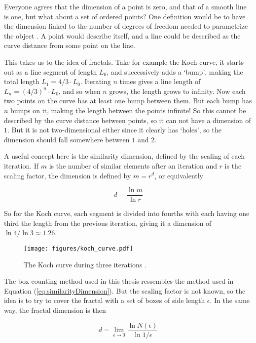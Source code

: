 Everyone agrees that the dimension of a point is zero, and that of a smooth line is one, but what about a set of ordered points? One definition would be to have the dimension linked to the number of degrees of freedom needed to parametrize the object \cite{strogatz:dynamics_chaos}. A point would describe itself, and a line could be described as the curve distance from some point on the line.

This takes us to the idea of fractals. Take for example the Koch curve, it starts out as a line segment of length $L_0$, and successively adds a `bump', making the total length $L_1 = 4/3 \cdot L_0$. Iterating $n$ times gives a line length of $L_n = {(4 / 3)}^n \cdot L_0$, and so when $n$ grows, the length grows to infinity. Now each two points on the curve has at least one bump between them. But each bump has $n$ bumps on it, making the length between the points infinite! So this cannot be described by the curve distance between points, so it can not have a dimension of $1$. But it is not two-dimensional either since it clearly has `holes', so the dimension should fall somewhere between $1$ and $2$.

A useful concept here is the similarity dimension, defined by the scaling of each iteration. If $m$ is the number of similar elements after an iteration and $r$ is the scaling factor, the dimension is defined by $m = r^d$, or equivalently

\begin{equation}
	d = \frac{\ln m}{\ln r}
\label{eq:similarityDimension}
\end{equation}

So for the Koch curve, each segment is divided into fourths with each having one third the length from the previous iteration, giving it a dimension of $\ln 4 / \ln 3 \approx 1.26$.

\begin{figure}[h!]
    \centering
        \texttt{[image: figures/koch\_curve.pdf]}
    \caption{The Koch curve during three iterations \cite{strogatz:dynamics_chaos}.}
    \label{fig:koch_curve}
\end{figure}

The box counting method used in this thesis ressembles the method used in Equation (\ref{eq:similarityDimension}). But the scaling factor is not known, so the idea is to try to cover the fractal with a set of boxes of side length $\epsilon$. In the same way, the fractal dimension is then

\begin{equation}
    d = \lim_{\epsilon \to 0} \frac{\ln N(\epsilon)}{\ln 1 / \epsilon}
\end{equation}

